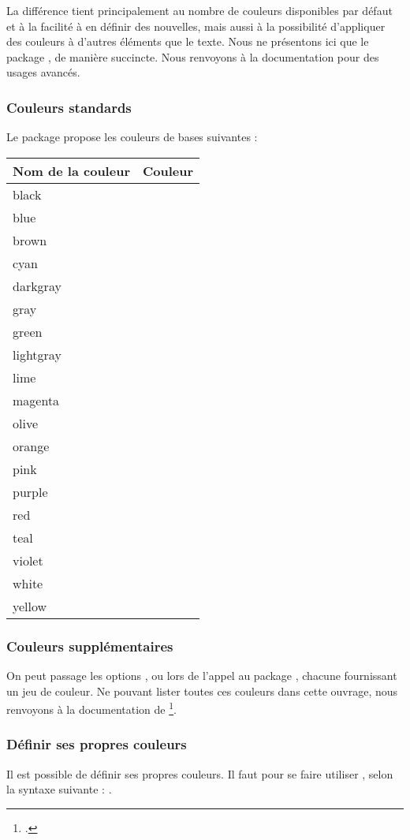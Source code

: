 La différence tient principalement au nombre de couleurs disponibles par défaut et à la facilité à en définir des nouvelles, mais aussi à la possibilité d'appliquer des couleurs à d'autres éléments que le texte. Nous ne présentons ici que le package , de manière succincte. Nous renvoyons à la documentation pour des usages avancés.

\subsubsection{Couleurs standards}
Le package  propose les couleurs de bases suivantes : 

\newcommand{\exemplecouleur}[1]{#1 & \fcolorbox{black}{#1}{~} \\}

\begin{longtable}{|l|l|}
	\hline
	Nom de la couleur 		& Couleur 								\\
	\hline
	\endhead
	\hline
	\endfoot
	\exemplecouleur{black}
	\exemplecouleur{blue}
	\exemplecouleur{brown}
	\exemplecouleur{cyan}
	\exemplecouleur{darkgray}
	\exemplecouleur{gray}
	\exemplecouleur{green}
	\exemplecouleur{lightgray}
	\exemplecouleur{lime}
	\exemplecouleur{magenta}
	\exemplecouleur{olive}
	\exemplecouleur{orange}
	\exemplecouleur{pink}
	\exemplecouleur{purple}
	\exemplecouleur{red}
	\exemplecouleur{teal}
	\exemplecouleur{violet}
	\exemplecouleur{white}
	\exemplecouleur{yellow}
	
\end{longtable}

\subsubsection{Couleurs supplémentaires}

On peut passage les options ,  ou  lors de l'appel au package , chacune fournissant un jeu de couleur. Ne pouvant lister toutes ces couleurs dans cette ouvrage, nous renvoyons à la documentation de \footcite{xcolor_jeu}.

\subsubsection{Définir ses propres couleurs}

Il est possible de définir ses propres couleurs. Il faut pour se faire utiliser , selon la syntaxe suivante : .


